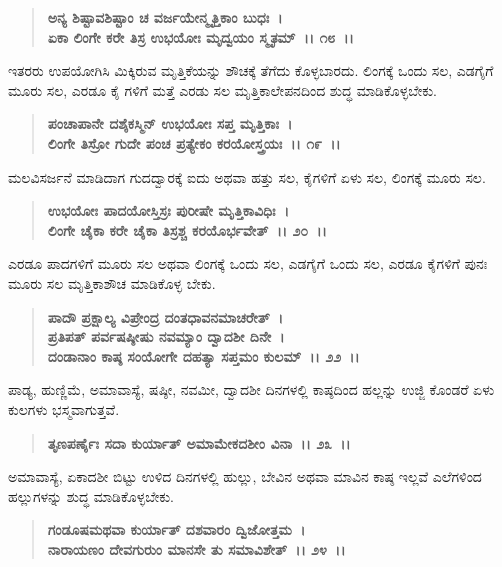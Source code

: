 \begin{verse}
\textbf{ಅನ್ಯ ಶಿಷ್ಟಾವಶಿಷ್ಟಾಂ ಚ ವರ್ಜಯೇನ್ಮೃತ್ತಿಕಾಂ ಬುಧಃ~।}\\\textbf{ಏಕಾ ಲಿಂಗೇ ಕರೇ ತಿಸ್ರ ಉಭಯೋಃ ಮೃದ್ವಯಂ ಸ್ಮೃತಮ್~।। ೧೮~।।}
\end{verse}

ಇತರರು ಉಪಯೋಗಿಸಿ ಮಿಕ್ಕಿರುವ ಮೃತ್ತಿಕೆಯನ್ನು ಶೌಚಕ್ಕೆ ತೆಗೆದು ಕೊಳ್ಳಬಾರದು. ಲಿಂಗಕ್ಕೆ ಒಂದು ಸಲ, ಎಡಗೈಗೆ ಮೂರು ಸಲ, ಎರಡೂ ಕೈ ಗಳಿಗೆ ಮತ್ತೆ ಎರಡು ಸಲ ಮೃತ್ತಿಕಾ\-ಲೇಪನದಿಂದ ಶುದ್ಧ ಮಾಡಿಕೊಳ್ಳಬೇಕು.

\begin{verse}
\textbf{ಪಂಚಾಪಾನೇ ದಶೈಕಸ್ಮಿನ್ ಉಭಯೋಃ ಸಪ್ತ ಮೃತ್ತಿಕಾಃ~।}\\\textbf{ಲಿಂಗೇ ತಿಸ್ರೋ ಗುದೇ ಪಂಚ ಪ್ರತ್ಯೇಕಂ ಕರಯೋಸ್ತ್ರಯಃ~।। ೧೯~।।}
\end{verse}

ಮಲವಿಸರ್ಜನೆ ಮಾಡಿದಾಗ ಗುದದ್ವಾರಕ್ಕೆ ಐದು ಅಥವಾ ಹತ್ತು ಸಲ, ಕೈಗಳಿಗೆ ಏಳು ಸಲ, ಲಿಂಗಕ್ಕೆ ಮೂರು ಸಲ.

\begin{verse}
\textbf{ಉಭಯೋಃ ಪಾದಯೋಸ್ತಿಸ್ರಃ ಪುರೀಷೇ ಮೃತ್ತಿಕಾವಿಧಿಃ~।}\\\textbf{ಲಿಂಗೇ ಚೈಕಾ ಕರೇ ಚೈಕಾ ತಿಸ್ರಶ್ಚ ಕರಯೊರ್ಭವೇತ್~।। ೨೦~।।}
\end{verse}

ಎರಡೂ ಪಾದಗಳಿಗೆ ಮೂರು ಸಲ ಅಥವಾ ಲಿಂಗಕ್ಕೆ ಒಂದು ಸಲ, ಎಡಗೈಗೆ ಒಂದು ಸಲ, ಎರಡೂ ಕೈಗಳಿಗೆ ಪುನಃ ಮೂರು ಸಲ ಮೃತ್ತಿಕಾಶೌಚ ಮಾಡಿಕೊಳ್ಳ ಬೇಕು.

\begin{verse}
\textbf{ಪಾದೌ ಪ್ರಕ್ಷಾಲ್ಯ ವಿಪ್ರೇಂದ್ರ ದಂತಧಾವನಮಾಚರೇತ್~।}\\\textbf{ಪ್ರತಿಪತ್ ಪರ್ವಷಷ್ಠೀಷು ನವಮ್ಯಾಂ ದ್ವಾದಶೀ ದಿನೇ~।}\\\textbf{ದಂಡಾನಾಂ ಕಾಷ್ಠ ಸಂಯೋಗೇ ದಹತ್ಯಾ ಸಪ್ತಮಂ ಕುಲಮ್~।। ೨೨~।।}
\end{verse}

ಪಾಡ್ಯ, ಹುಣ್ಣಿಮೆ, ಅಮಾವಾಸ್ಯೆ, ಷಷ್ಠೀ, ನವಮೀ, ದ್ವಾದಶೀ ದಿನಗಳಲ್ಲಿ ಕಾಷ್ಠದಿಂದ ಹಲ್ಲನ್ನು ಉಜ್ಜಿ ಕೊಂಡರೆ ಏಳು ಕುಲಗಳು ಭಸ್ಮವಾಗುತ್ತವೆ.

\begin{verse}
\textbf{ತೃಣಪರ್ಣೈಃ ಸದಾ ಕುರ್ಯಾತ್ ಅಮಾಮೇಕದಶೀಂ ವಿನಾ~।। ೨೩~।।}
\end{verse}

ಅಮಾವಾಸ್ಯೆ, ಏಕಾದಶೀ ಬಿಟ್ಟು ಉಳಿದ ದಿನಗಳಲ್ಲಿ ಹುಲ್ಲು, ಬೇವಿನ ಅಥವಾ ಮಾವಿನ ಕಾಷ್ಠ ಇಲ್ಲವೆ ಎಲೆಗಳಿಂದ ಹಲ್ಲುಗಳನ್ನು ಶುದ್ಧ ಮಾಡಿಕೊಳ್ಳಬೇಕು.

\begin{verse}
\textbf{ಗಂಡೂಷಮಥವಾ ಕುರ್ಯಾತ್ ದಶವಾರಂ ದ್ವಿಜೋತ್ತಮ~।}\\\textbf{ನಾರಾಯಣಂ ದೇವಗುರುಂ ಮಾನಸೇ ತು ಸಮಾವಿಶೇತ್~।। ೨೪~।।}
\end{verse}


